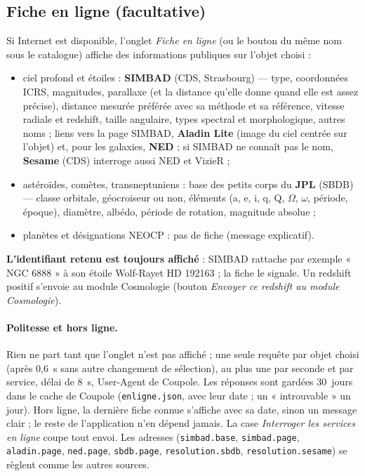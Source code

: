 \subsection{Fiche en ligne (facultative)}\label{sec:fiche}
Si Internet est disponible, l'onglet \emph{Fiche en ligne} (ou le bouton du même nom sous le catalogue) affiche des
informations publiques sur l'objet choisi :
\begin{itemize}
\item ciel profond et étoiles : \textbf{SIMBAD} (CDS, Strasbourg) --- type, coordonnées ICRS, magnitudes, parallaxe
(et la distance qu'elle donne quand elle est assez précise), distance mesurée préférée avec sa méthode et sa
référence, vitesse radiale et redshift, taille angulaire, types spectral et morphologique, autres noms ; liens
vers la page SIMBAD, \textbf{Aladin Lite} (image du ciel centrée sur l'objet) et, pour les galaxies, \textbf{NED} ;
si SIMBAD ne connaît pas le nom, \textbf{Sesame} (CDS) interroge aussi NED et VizieR ;
\item astéroïdes, comètes, transneptuniens : base des petits corps du \textbf{JPL} (SBDB) --- classe orbitale,
géocroiseur ou non, éléments (a, e, i, q, Q, $\Omega$, $\omega$, période, époque), diamètre, albédo, période de
rotation, magnitude absolue ;
\item planètes et désignations NEOCP : pas de fiche (message explicatif).
\end{itemize}
\textbf{L'identifiant retenu est toujours affiché} : SIMBAD rattache par exemple « NGC 6888 » à son étoile
Wolf-Rayet HD 192163 ; la fiche le signale. Un redshift positif s'envoie au module Cosmologie (bouton \emph{Envoyer
ce redshift au module Cosmologie}).

\paragraph{Politesse et hors ligne.} Rien ne part tant que l'onglet n'est pas affiché ; une seule requête par
objet choisi (après 0,6~s sans autre changement de sélection), au plus une par seconde et par service, délai de
8~s, User-Agent de Coupole. Les réponses sont gardées 30~jours dans le cache de Coupole (\texttt{enligne.json},
avec leur date ; un « introuvable » un jour). Hors ligne, la dernière fiche connue s'affiche avec sa date, sinon un
message clair ; le reste de l'application n'en dépend jamais. La case \emph{Interroger les services en ligne} coupe
tout envoi. Les adresses (\texttt{simbad.base}, \texttt{simbad.page}, \texttt{aladin.page}, \texttt{ned.page},
\texttt{sbdb.page}, \texttt{resolution.sbdb}, \texttt{resolution.sesame}) se règlent comme les autres sources.

